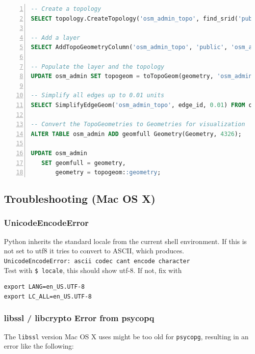 \documentclass[paper=a4, fontsize=11pt]{article} %
\numberwithin{equation}{section} %
\numberwithin{figure}{section} %
\numberwithin{table}{section} %
\begin{document}
{\begin{lstlisting}[language=sql,numbers=left]
-- Create a topology
SELECT topology.CreateTopology('osm_admin_topo', find_srid('public', 'osm_admin', 'geometry'));

-- Add a layer
SELECT AddTopoGeometryColumn('osm_admin_topo', 'public', 'osm_admin', 'topogeom', 'MULTIPOLYGON');

-- Populate the layer and the topology
UPDATE osm_admin SET topogeom = toTopoGeom(geometry, 'osm_admin_topo', 1);

-- Simplify all edges up to 0.01 units
SELECT SimplifyEdgeGeom('osm_admin_topo', edge_id, 0.01) FROM osm_admin_topo.edge;

-- Convert the TopoGeometries to Geometries for visualization
ALTER TABLE osm_admin ADD geomfull Geometry(Geometry, 4326);

UPDATE osm_admin
   SET geomfull = geometry,
       geometry = topogeom::geometry;
\end{lstlisting}

\clearpage
\subsection{Troubleshooting (Mac OS X)}\label{troubleshooting}

\subsubsection*{UnicodeEncodeError}\label{unicodeencodeerror}

Python inherits the standard locale from the current shell environment.
If this is not set to utf8 it tries to convert to ASCII, which
produces.\\
\texttt{UnicodeEncodeError:\ \textquotesingle{}ascii\textquotesingle{}\ codec\ can\textquotesingle{}t\ encode\ character}\\Test
with \texttt{\$\ locale}, this should show utf-8. If not, fix with
\begin{verbatim}
export LANG=en_US.UTF-8
export LC_ALL=en_US.UTF-8
\end{verbatim}

\subsubsection*{libssl / libcrypto Error from
psycopq}\label{libssl-libcrypto-error-from-psycopq}

The \texttt{libssl} version Mac OS X uses might be too old for
\texttt{psycopg}, resulting in an error like the following:

}
\end{document}
